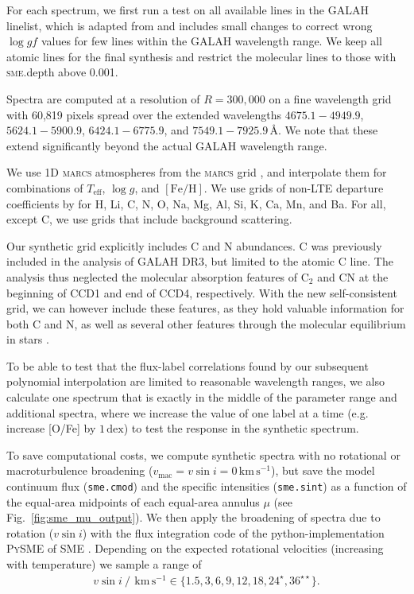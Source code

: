 \documentclass[
  journal=pasa,
  manuscript=research-paper, %
  year=2023,
  volume=37
]{cup-journal}
\newcommand{\SB}[1]{{\textcolor{purple}{#1}}}
\newcommand{\Teff}{$T_\mathrm{eff}$\xspace}
\newcommand{\logg}{$\log g$\xspace}
\newcommand{\feh}{$\mathrm{[Fe/H]}$\xspace}
\newcommand{\vsini}{$v \sin i$\xspace}
\newcommand{\marcs}{\textsc{marcs}\xspace}
\newcommand{\dex}{\,\mathrm{dex}}	%
\newcommand{\Angstroem}{\,\text{\AA}}	%
\newcommand{\kms}{\,\mathrm{km\,s^{-1}}}	%
\begin{document}

For each spectrum, we first run a test on all available lines in the GALAH linelist, which is adapted from \citet{Heiter2021} and includes small changes to correct wrong $\log gf$ values for few lines within the GALAH wavelength range. We keep all atomic lines for the final synthesis and restrict the molecular lines to those with \textsc{sme}.depth above 0.001.

Spectra are computed at a resolution of $R = 300,000$ on a fine wavelength grid with 60,819 pixels spread over the extended wavelengths $4675.1- 4949.9$, $5624.1-5900.9$, $6424.1-6775.9$, and $7549.1-7925.9 \Angstroem$. We note that these extend significantly beyond the actual GALAH wavelength range.

We use 1D \marcs atmospheres from the \marcs grid \citep[][version 2014]{Gustafsson2008}, and interpolate them for combinations of \Teff, \logg, and \feh. We use grids of non-LTE departure coefficients by \citet{Amarsi2020} for H, Li, C, N, O, Na, Mg, Al, Si, K, Ca, Mn, and Ba. For all, except C, we use grids that include background scattering.

Our synthetic grid explicitly includes C and N abundances. C was previously included in the analysis of GALAH DR3, but limited to the atomic C line. The analysis thus neglected the molecular absorption features of $\mathrm{C_2}$ and CN at the beginning of CCD1 and end of CCD4, respectively. With the new self-consistent grid, we can however include these features, as they hold valuable information for both C and N, as well as several other features through the molecular equilibrium in stars \citep[see e.g.][]{Ting2018}.

To be able to test that the flux-label correlations found by our subsequent polynomial interpolation are limited to reasonable wavelength ranges, we also calculate one spectrum that is exactly in the middle of the parameter range and additional spectra, where we increase the value of one label at a time (e.g. increase [O/Fe] by $1\dex$) to test the response in the synthetic spectrum.

To save computational costs, we compute synthetic spectra with no rotational or macroturbulence broadening ($v_\text{mac} = v\sin i = 0\kms$), but save the model continuum flux (\texttt{sme.cmod}) and the specific intensities (\texttt{sme.sint}) as a function of the equal-area midpoints of each equal-area annulus $\mu$ (see Fig.~\ref{fig:sme_mu_output}). We then apply the broadening of spectra due to rotation (\vsini) with the flux integration code of the python-implementation \textsc{PySME} \citep{Wehrhahn2021} of \textsc{SME} \citep{Piskunov2017}. Depending on the expected rotational velocities (increasing with temperature) we sample a range of
\begin{align} \label{eq:vsini}
    v \sin i~/~\kms \in \{ 1.5, 3, 6, 9, 12, 18, 24^\star, 36^{\star \star}\}.
\end{align}
\end{document}
